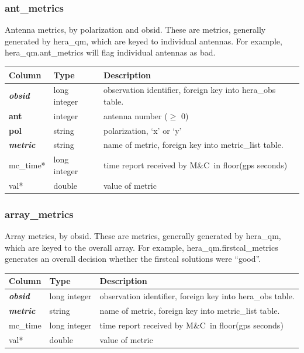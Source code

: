 \documentclass{article}
\newcommand{\mc}{M\&C}
\begin{document}
{\subsubsection{ant\_metrics}
Antenna metrics, by polarization and obsid. These are metrics, generally generated by
hera\_qm, which are keyed to individual antennas. For example, hera\_qm.ant\_metrics
will flag individual antennas as bad.

\begin{center}
 \begin{tabular}{| p{4cm} | p{2cm} | p{10cm} |}
\hline
 {\bf Column} & {\bf Type}  & {\bf Description} \\ [0.5ex]  \hline\hline
\textbf{\textit{obsid}} & long integer & observation identifier, foreign key into hera\_obs table. \\ \hline
\textbf{ant} & integer & antenna number ($\geq$ 0) \\ \hline
\textbf{pol} & string & polarization, `x' or `y' \\ \hline
\textbf{\textit{metric}} & string & name of metric, foreign key into metric\_list table. \\ \hline
mc\_time* & long integer & time report received by \mc\ in floor(gps seconds) \\ \hline
val* & double & value of metric \\ \hline
\end{tabular}
\end{center}

\subsubsection{array\_metrics}
Array metrics, by obsid. These are metrics, generally generated by
hera\_qm, which are keyed to the overall array. For example, hera\_qm.firstcal\_metrics
generates an overall decision whether the firstcal solutions were ``good''.

\begin{center}
 \begin{tabular}{| p{4cm} | p{2cm} | p{10cm} |}
\hline
 {\bf Column} & {\bf Type}  & {\bf Description} \\ [0.5ex]  \hline\hline
\textbf{\textit{obsid}} & long integer & observation identifier, foreign key into hera\_obs table. \\ \hline
\textbf{\textit{metric}} & string & name of metric, foreign key into metric\_list table. \\ \hline
mc\_time & long integer & time report received by \mc\ in floor(gps seconds) \\ \hline
val* & double & value of metric \\ \hline
\end{tabular}
\end{center}


}
\end{document}
